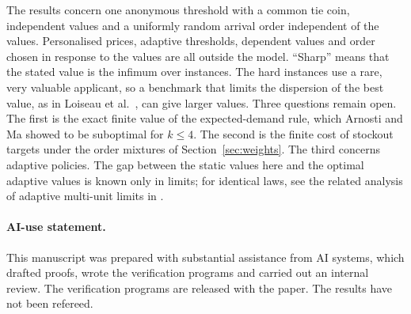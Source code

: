 \documentclass[11pt,a4paper]{article}
\theoremstyle{remark}
\begin{document}
The results concern one anonymous threshold with a common tie coin, independent values and a uniformly random arrival order independent of the values. Personalised prices, adaptive thresholds, dependent values and order chosen in response to the values are all outside the model. ``Sharp'' means that the stated value is the infimum over instances. The hard instances use a rare, very valuable applicant, so a benchmark that limits the dispersion of the best value, as in Loiseau et al.\ \cite{lmpsv}, can give larger values. Three questions remain open. The first is the exact finite value of the expected-demand rule, which Arnosti and Ma showed to be suboptimal for $k\le4$. The second is the finite cost of stockout targets under the order mixtures of Section~\ref{sec:weights}. The third concerns adaptive policies. The gap between the static values here and the optimal adaptive values is known only in limits; for identical laws, see the related analysis of adaptive multi-unit limits in \cite{epiid}.

\paragraph{AI-use statement.}
This manuscript was prepared with substantial assistance from AI systems, which drafted proofs, wrote the verification programs and carried out an internal review. The verification programs are released with the paper. The results have not been refereed.
\end{document}
